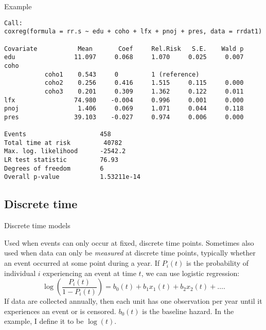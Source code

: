 \documentclass[10pt,ignorenonframetext,]{beamer}
\begin{document}
\begin{frame}[fragile]{Example}

\scriptsize

\begin{verbatim}
Call:
coxreg(formula = rr.s ~ edu + coho + lfx + pnoj + pres, data = rrdat1)

Covariate           Mean       Coef     Rel.Risk   S.E.    Wald p
edu                11.097     0.068     1.070     0.025     0.007 
coho 
           coho1    0.543     0         1 (reference)
           coho2    0.256     0.416     1.515     0.115     0.000 
           coho3    0.201     0.309     1.362     0.122     0.011 
lfx                74.980    -0.004     0.996     0.001     0.000 
pnoj                1.406     0.069     1.071     0.044     0.118 
pres               39.103    -0.027     0.974     0.006     0.000 

Events                    458 
Total time at risk         40782 
Max. log. likelihood      -2542.2 
LR test statistic         76.93 
Degrees of freedom        6 
Overall p-value           1.53211e-14
\end{verbatim}

\end{frame}

\subsection{Discrete time}\label{discrete-time}

\begin{frame}{Discrete time models}

Used when events can only occur at fixed, discrete time points.
Sometimes also used when data can only be \emph{measured} at discrete
time points, typically whether an event occurred at some point during a
year. If \(P_i(t)\) is the probability of individual \(i\) experiencing
an event at time \(t\), we can use logistic regression: \[
\log\left(\frac{P_i(t)}{1-P_i(t)}\right) = b_0(t) + b_1 x_1(t) + b_2
x_2(t) + \dots.
\] If data are collected annually, then each unit has one observation
per year until it experiences an event or is censored. \(b_0(t)\) is the
baseline hazard. In the example, I define it to be \(\log(t).\)

\end{frame}
\end{document}
